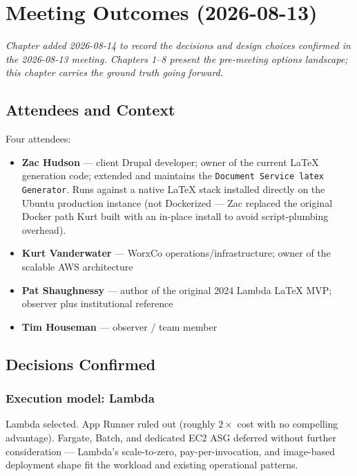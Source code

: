 \documentclass[11pt,letterpaper]{article}
\begin{document}
\newpage

\section{Meeting Outcomes (2026-08-13)}
\label{sec:meeting-outcomes}

\emph{Chapter added 2026-08-14 to record the decisions and design choices confirmed in the 2026-08-13 meeting. Chapters 1--8 present the pre-meeting options landscape; this chapter carries the ground truth going forward.}

\subsection{Attendees and Context}
Four attendees:
\begin{itemize}[nosep]
  \item \textbf{Zac Hudson} --- client Drupal developer; owner of the current LaTeX generation code; extended and maintains the \texttt{Document Service latex Generator}. Runs against a native LaTeX stack installed directly on the Ubuntu production instance (not Dockerized --- Zac replaced the original Docker path Kurt built with an in-place install to avoid script-plumbing overhead).
  \item \textbf{Kurt Vanderwater} --- WorxCo operations/infrastructure; owner of the scalable AWS architecture
  \item \textbf{Pat Shaughnessy} --- author of the original 2024 Lambda LaTeX MVP; observer plus institutional reference
  \item \textbf{Tim Houseman} --- observer / team member
\end{itemize}

\subsection{Decisions Confirmed}
\label{sec:meeting-decisions}

\subsubsection{Execution model: Lambda}
Lambda selected. App Runner ruled out (roughly $2\times$ cost with no compelling advantage). Fargate, Batch, and dedicated EC2 ASG deferred without further consideration --- Lambda's scale-to-zero, pay-per-invocation, and image-based deployment shape fit the workload and existing operational patterns.
\end{document}

